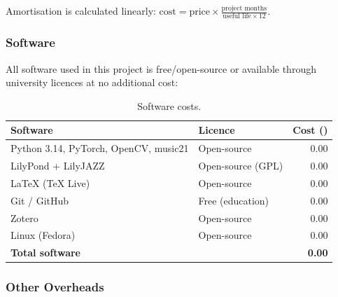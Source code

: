 \documentclass[11pt, a4paper]{article}
\begin{document}
Amortisation is calculated linearly: $\text{cost} = \text{price} \times \frac{\text{project months}}{\text{useful life} \times 12}$.

\subsubsection{Software}

All software used in this project is free/open-source or available through university licences at no additional cost:

\begin{table}[h!]
    \centering
    \caption{Software costs.}
    \label{tab:sw}
    \renewcommand{\arraystretch}{1.1}
    \begin{tabularx}{\linewidth}{l l r}
        \toprule
        \textbf{Software} & \textbf{Licence} & \textbf{Cost (\EUR{})} \\
        \midrule
        Python 3.14, PyTorch, OpenCV, music21 & Open-source  & 0.00 \\
        LilyPond + LilyJAZZ                   & Open-source (GPL) & 0.00 \\
        \LaTeX{} (TeX Live)                    & Open-source  & 0.00 \\
        Git / GitHub                           & Free (education) & 0.00 \\
        Zotero                                 & Open-source  & 0.00 \\
        Linux (Fedora)                         & Open-source  & 0.00 \\
        \midrule
        \multicolumn{2}{l}{\textbf{Total software}} & \textbf{0.00} \\
        \bottomrule
    \end{tabularx}
\end{table}

\subsubsection{Other Overheads}
\end{document}
